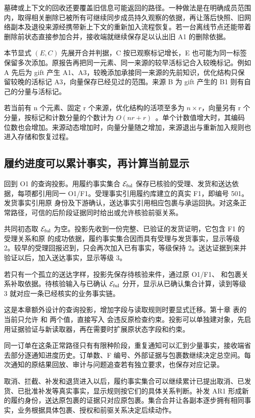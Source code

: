 墓碑或上下文的回收还要覆盖旧信息可能返回的路径。一种做法是在明确成员范围内，取得相关删除已被所有可继续同步成员持久观察的依据，再让落后快照、旧网络副本及退役来源经携带新上下文的重新加入流程恢复。若一台离线节点还能带着删除前状态直接参加合并，接收端就继续保存足以认出旧 A1 的删除依据。

本节显式 $(E,C)$ 先展开合并判据，C 按已观察标记增长，E 也可能为同一标签保留多次添加。原报告再把同一元素、同一来源的较早活标记合入较晚标记。例如 A 先后为 gift 产生 A1、A3，较晚添加承接同一来源的先前知识，优化结构只保留较晚的活标记 A3，向量保存已经见过的范围。来源 B 为 gift 产生的 B1 则有自己的分量与活标记。


若当前有 n 个元素、固定 r 个来源，优化结构的活项至多为 $n\times r$，向量另有 r 个分量，按标记和计数分量的个数计为 $O(nr+r)$~\cite{bieniusa2012orset}。单个计数值增大时，其编码位数也会增加。来源动态增加时，向量分量随之增加，来源退出与重新加入规则也进入存储和恢复过程。

\subsection*{履约进度可以累计事实，再计算当前显示}

回到 O1 的查询投影。用履约事实集合 $\mathcal E_{\rm ful}$ 保存已核验的受理、发货和送达依据，每项都引用同一 O1/F1。受理事实引用履约库建立的真实 F1，即编号 501。发货事实引用原  身份及下游确认，送达事实引用相应包裹与承运回执。对这条正常路径，可信的后阶段证据同时给出或允许核验前驱关系。

共同初态取 $\mathcal E_{\rm ful}$ 为空。投影先收到一份完整、已验证的发货证明，它包含 F1 的受理关系和原  的成功依据，履约事实集合因而具有受理与发货事实，显示等级 2。较早的受理回报迟到，只会再次加入已有事实，等级保持 2。送达证据到来并验证以后，加入送达事实，显示等级 3。

若只有一个孤立的送达字样，投影先保存待核验来件，通过原 O1/F1、 和包裹关系补取依据。待核验输入与已确认 $\mathcal E_{\rm ful}$ 分开，显示从已确认集合计算，读到等级 3 就对应一条已经核实的业务事实链。


这是本章额外设计的查询投影，增加字段与读取规则时要显式迁移。第十章  表的  当前只允许  和  两个值，直接写入  会违反原检查约束。投影可以单独建对象，先启用证据验证与新读取器，再在需要时扩展原状态字段和约束。

同一订单在这条正常路径只有有限种阶段，重复通知可以汇到少量事实，接收端省去部分逐通知进度历史。订单数、F 编号、外部证据与包裹数继续决定总空间。每次通知的原结果回放、审计与问题追查若有独立要求，也保存对应记录。

取消、拦截、补发和退货进入以后，履约事实集合可以继续累计已提出取消、已发货、已批准补发等真实事实，显示规则按它们的具体关系判断。补发 AR1 形成新的履约身份，送达原包裹的证据只对应原包裹。集合合并让各副本逐步拥有相同事实，业务根据具体包裹、授权和前驱关系决定后续动作。
\FloatBarrier

